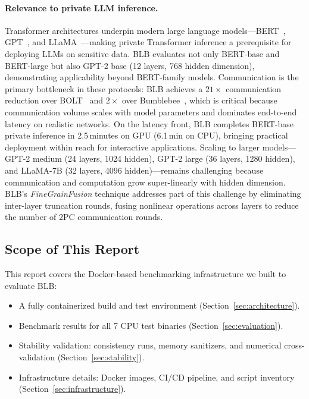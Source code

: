 \paragraph{Relevance to private LLM inference.}
Transformer architectures underpin modern large language models---BERT~\cite{devlin2019bert}, GPT~\cite{radford2019gpt2}, and LLaMA~\cite{touvron2023llama}---making private Transformer inference a prerequisite for deploying LLMs on sensitive data.
BLB evaluates not only BERT-base and BERT-large but also GPT-2 base (12 layers, 768 hidden dimension), demonstrating applicability beyond BERT-family models.
Communication is the primary bottleneck in these protocols: BLB achieves a $21\times$ communication reduction over BOLT~\cite{pang2024bolt} and $2\times$ over Bumblebee~\cite{lu2023bumblebee}, which is critical because communication volume scales with model parameters and dominates end-to-end latency on realistic networks.
On the latency front, BLB completes BERT-base private inference in 2.5\,minutes on GPU (6.1\,min on CPU), bringing practical deployment within reach for interactive applications.
Scaling to larger models---GPT-2 medium (24 layers, 1024 hidden), GPT-2 large (36 layers, 1280 hidden), and LLaMA-7B (32 layers, 4096 hidden)---remains challenging because communication and computation grow super-linearly with hidden dimension.
BLB's \emph{FineGrainFusion} technique addresses part of this challenge by eliminating inter-layer truncation rounds, fusing nonlinear operations across layers to reduce the number of 2PC communication rounds.

\subsection{Scope of This Report}

This report covers the Docker-based benchmarking infrastructure we built to evaluate BLB:
\begin{itemize}[nosep]
  \item A fully containerized build and test environment (Section~\ref{sec:architecture}).
  \item Benchmark results for all 7 CPU test binaries (Section~\ref{sec:evaluation}).
  \item Stability validation: consistency runs, memory sanitizers, and numerical cross-validation (Section~\ref{sec:stability}).
  \item Infrastructure details: Docker images, CI/CD pipeline, and script inventory (Section~\ref{sec:infrastructure}).
\end{itemize}

